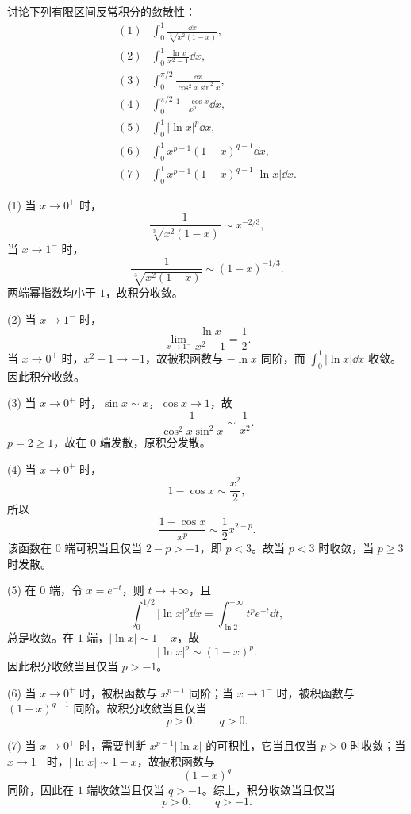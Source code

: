 \begin{problem}
	讨论下列有限区间反常积分的敛散性：
	\[
	\begin{array}{ll}
		(1)&\displaystyle \int_0^1\frac{\dd x}{\sqrt[3]{x^2(1-x)}},\\[8pt]
		(2)&\displaystyle \int_0^1\frac{\ln x}{x^2-1}\dd x,\\[8pt]
		(3)&\displaystyle \int_0^{\pi/2}\frac{\dd x}{\cos^2x\sin^2x},\\[8pt]
		(4)&\displaystyle \int_0^{\pi/2}\frac{1-\cos x}{x^p}\dd x,\\[8pt]
		(5)&\displaystyle \int_0^1 |\ln x|^p\dd x,\\[8pt]
		(6)&\displaystyle \int_0^1x^{p-1}(1-x)^{q-1}\dd x,\\[8pt]
		(7)&\displaystyle \int_0^1x^{p-1}(1-x)^{q-1}|\ln x|\dd x.
	\end{array}
	\]
\end{problem}

\begin{solution}
	(1) 当 $x\to0^+$ 时，
	\[
	\frac1{\sqrt[3]{x^2(1-x)}}\sim x^{-2/3},
	\]
	当 $x\to1^-$ 时，
	\[
	\frac1{\sqrt[3]{x^2(1-x)}}\sim (1-x)^{-1/3}.
	\]
	两端幂指数均小于 $1$，故积分收敛。
	
	(2) 当 $x\to1^-$ 时，
	\[
	\lim_{x\to1^-}\frac{\ln x}{x^2-1}=\frac12.
	\]
	当 $x\to0^+$ 时，$x^2-1\to-1$，故被积函数与 $-\ln x$ 同阶，而 $\displaystyle\int_0^1|\ln x|\dd x$ 收敛。因此积分收敛。
	
	(3) 当 $x\to0^+$ 时，$\sin x\sim x$，$\cos x\to1$，故
	\[
	\frac1{\cos^2x\sin^2x}\sim \frac1{x^2}.
	\]
	$p=2\geq1$，故在 $0$ 端发散，原积分发散。
	
	(4) 当 $x\to0^+$ 时，
	\[
	1-\cos x\sim \frac{x^2}{2},
	\]
	所以
	\[
	\frac{1-\cos x}{x^p}\sim \frac12x^{2-p}.
	\]
	该函数在 $0$ 端可积当且仅当 $2-p>-1$，即 $p<3$。故当 $p<3$ 时收敛，当 $p\geq3$ 时发散。
	
	(5) 在 $0$ 端，令 $x=e^{-t}$，则 $t\to+\infty$，且
	\[
	\int_0^{1/2}|\ln x|^p\dd x
	=\int_{\ln2}^{+\infty} t^p e^{-t}\dd t,
	\]
	总是收敛。在 $1$ 端，$|\ln x|\sim 1-x$，故
	\[
	|\ln x|^p\sim (1-x)^p.
	\]
	因此积分收敛当且仅当 $p>-1$。
	
	(6) 当 $x\to0^+$ 时，被积函数与 $x^{p-1}$ 同阶；当 $x\to1^-$ 时，被积函数与 $(1-x)^{q-1}$ 同阶。故积分收敛当且仅当
	\[
	p>0,
	\qquad
	q>0.
	\]
	
	(7) 当 $x\to0^+$ 时，需要判断 $x^{p-1}|\ln x|$ 的可积性，它当且仅当 $p>0$ 时收敛；当 $x\to1^-$ 时，$|\ln x|\sim1-x$，故被积函数与
	\[
	(1-x)^q
	\]
	同阶，因此在 $1$ 端收敛当且仅当 $q>-1$。综上，积分收敛当且仅当
	\[
	p>0,
	\qquad
	q>-1.
	\]
\end{solution}

